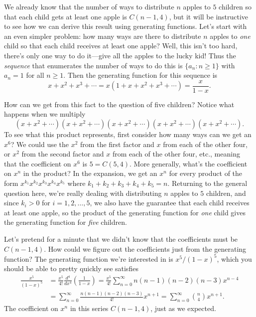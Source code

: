 \begin{example}
  We already know that the number of ways to distribute $n$ apples to
  $5$ children so that each child gets at least one apple is
  $C(n-1,4)$, but it will be instructive to see how we can derive this
  result using generating functions. Let's start with an even simpler
  problem: how many ways are there to distribute $n$ apples to
  \textit{one} child so that each child receives at least one apple?
  Well, this isn't too hard, there's only one way to do it---give all
  the apples to the lucky kid! Thus the \textit{sequence} that
  enumerates the number of ways to do this is $\{a_n\colon n\geq 1\}$
  with $a_n=1$ for all $n\geq 1$. Then the generating function for
  this sequence is
  \[x+x^2+x^3+\cdots = x(1+x+x^2+x^3+\cdots) = \frac{x}{1-x}.\]

  How can we get from this fact to the question of five children?
  Notice what happens when we multiply
  \[(x+x^2+\cdots)(x+x^2+\cdots)(x+x^2+\cdots)(x+x^2+\cdots)
  (x+x^2+\cdots).\] To see what this product represents, first
  consider how many ways can we get an $x^6$? We could use the $x^2$
  from the first factor and $x$ from each of the other four, or $x^2$
  from the second factor and $x$ from each of the other four, etc.,
  meaning that the coefficient on $x^6$ is $5 = C(5,4)$. More
  generally, what's the coefficient on $x^n$ in the product? In the
  expansion, we get an $x^n$ for every product of the form
  $x^{k_1}x^{k_2}x^{k_3}x^{k_4}x^{k_5}$ where $k_1+k_2+k_3+k_4+k_5 =
  n$. Returning to the general question here, we're really dealing
  with distributing $n$ apples to $5$ children, and since $k_i> 0$ for
  $i=1,2,\dots,5$, we also have the guarantee that each child receives
  at least one apple, so the product of the generating function for
  \textit{one} child gives the generating function for \textit{five}
  children.

  Let's pretend for a minute that we didn't know that the coefficients
  must be $C(n-1,4)$. How could we figure out the coefficients just
  from the generating function? The generating function we're
  interested in is $x^5/(1-x)^5$, which you should be able to pretty
  quickly see satisfies
  \begin{align*}
    \frac{x^5}{(1-x)^5} &=
  \frac{x^5}{4!}\frac{d^4}{dx^4}\left(\frac{1}{1-x}\right) =
  \frac{x^5}{4!}\sum_{n=0}^\infty n(n-1)(n-2)(n-3)x^{n-4}\\
  & =\sum_{n=0}^\infty \frac{n(n-1)(n-2)(n-3)}{4!}x^{n+1} =
  \sum_{n=0}^\infty \binom{n}{4}x^{n+1}.
  \end{align*}
  The coefficient on $x^n$ in this series $C(n-1,4)$, just as we expected.
\end{example}

